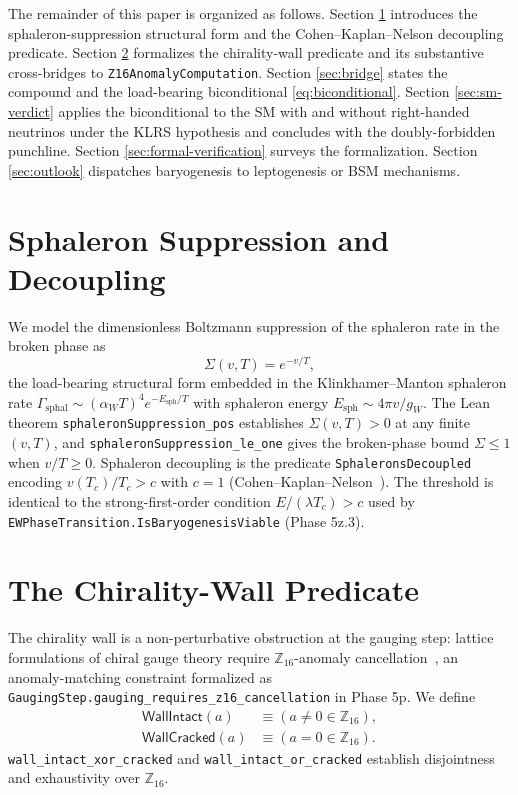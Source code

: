 \documentclass[aps,prl,twocolumn,showpacs,superscriptaddress,nofootinbib]{revtex4-2}
\newcommand{\WallIntact}{\mathsf{WallIntact}}
\newcommand{\WallCracked}{\mathsf{WallCracked}}
\newcommand{\EWBGViable}{\mathsf{EWBGViable}}
\newcommand{\Zsixteen}{\mathbb{Z}_{16}}
\begin{document}
The remainder of this paper is organized as follows. Section
\ref{sec:sphaleron} introduces the sphaleron-suppression structural
form and the Cohen--Kaplan--Nelson decoupling predicate. Section
\ref{sec:wall} formalizes the chirality-wall predicate and its
substantive cross-bridges to
\texttt{Z16AnomalyComputation}. Section \ref{sec:bridge} states the
compound \EWBGViable{} and the load-bearing biconditional
\eqref{eq:biconditional}. Section \ref{sec:sm-verdict} applies the
biconditional to the SM with and without right-handed neutrinos under
the KLRS hypothesis and concludes with the doubly-forbidden punchline.
Section \ref{sec:formal-verification} surveys the formalization.
Section \ref{sec:outlook} dispatches baryogenesis to leptogenesis or
BSM mechanisms.

\section{Sphaleron Suppression and Decoupling}
\label{sec:sphaleron}

We model the dimensionless Boltzmann suppression of the sphaleron rate
in the broken phase as
\begin{equation}
\label{eq:sphaleron-suppression}
\Sigma(v, T) = e^{-v/T},
\end{equation}
the load-bearing structural form embedded in the
Klinkhamer--Manton sphaleron rate $\Gamma_\mathrm{sphal} \sim
(\alpha_W T)^4 e^{-E_\mathrm{sph}/T}$ with sphaleron energy
$E_\mathrm{sph} \sim 4\pi v / g_W$. The Lean theorem
\texttt{sphaleronSuppression\_pos} establishes
$\Sigma(v, T) > 0$ at any finite $(v, T)$, and
\texttt{sphaleronSuppression\_le\_one} gives the broken-phase bound
$\Sigma \le 1$ when $v/T \ge 0$. Sphaleron decoupling is the
predicate \texttt{SphaleronsDecoupled} encoding $v(T_c)/T_c > c$
with $c = 1$ (Cohen--Kaplan--Nelson~\cite{CohenKaplanNelson1993}).
The threshold is identical to the strong-first-order condition
$E/(\lambda T_c) > c$ used by
\texttt{EWPhaseTransition.IsBaryogenesisViable} (Phase 5z.3).

\section{The Chirality-Wall Predicate}
\label{sec:wall}

The chirality wall is a non-perturbative obstruction at the gauging
step: lattice formulations of chiral gauge theory require
$\Zsixteen$-anomaly cancellation~\cite{WangWanYou2022,Wang2020}, an
anomaly-matching constraint formalized as
\texttt{GaugingStep.gauging\_requires\_z16\_cancellation} in Phase 5p.
We define
\begin{align}
\label{eq:wall-intact}
\WallIntact{}(a) &\equiv (a \ne 0 \in \Zsixteen), \\
\label{eq:wall-cracked}
\WallCracked{}(a) &\equiv (a = 0 \in \Zsixteen).
\end{align}
\texttt{wall\_intact\_xor\_cracked} and \texttt{wall\_intact\_or\_cracked}
establish disjointness and exhaustivity over $\Zsixteen$.
\end{document}
